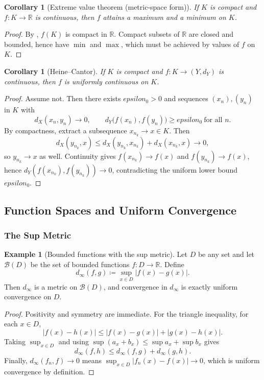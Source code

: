 \documentclass[12pt]{article}
\numberwithin{equation}{section}
\def\abs#1{|#1|}
\def\eps{epsilon}
\newcommand{\RR}{\mathbb{R}}
\DeclarePairedDelimiter{\abs}{\lvert}{\rvert}
\newcommand{\eps}{\varepsilon}               %
\theoremstyle{plain}
\newtheorem{corollary}[theorem]{Corollary}
\theoremstyle{definition}
\newtheorem{example}[theorem]{Example}
\theoremstyle{remark}
\begin{document}
\begin{corollary}[Extreme value theorem (metric-space form)]\label{ms:cor:evt}
If $K$ is compact and $f:K\to\RR$ is continuous, then $f$ attains a maximum and a minimum on $K$.
\end{corollary}

\begin{proof}
By , $f(K)$ is compact in $\RR$.
Compact subsets of $\RR$ are closed and bounded, hence have $\min$ and $\max$, which must be achieved by values of $f$ on $K$.
\end{proof}

\begin{corollary}[Heine--Cantor]\label{ms:cor:heine-cantor}
If $K$ is compact and $f:K\to(Y,d_Y)$ is continuous, then $f$ is uniformly continuous on $K$.
\end{corollary}

\begin{proof}
Assume not. Then there exists $\eps_0>0$ and sequences $(x_n),(y_n)$ in $K$ with
\[
d_X(x_n,y_n)\to 0,
\qquad
d_Y\bigl(f(x_n),f(y_n)\bigr)\ge \eps_0\ \text{for all }n.
\]
By compactness, extract a subsequence $x_{n_k}\to x\in K$.
Then
\[
d_X(y_{n_k},x)\le d_X(y_{n_k},x_{n_k})+d_X(x_{n_k},x)\to 0,
\]
so $y_{n_k}\to x$ as well.
Continuity gives $f(x_{n_k})\to f(x)$ and $f(y_{n_k})\to f(x)$, hence
$d_Y(f(x_{n_k}),f(y_{n_k}))\to 0$, contradicting the uniform lower bound $\eps_0$.
\end{proof}

\subsection{Function Spaces and Uniform Convergence}

\subsubsection{The Sup Metric}

\begin{example}[Bounded functions with the sup metric]\label{ms:ex:sup-metric}
Let $D$ be any set and let $\mathcal{B}(D)$ be the set of bounded functions $f:D\to\RR$.
Define
\[
d_\infty(f,g)\coloneqq \sup_{x\in D}\abs{f(x)-g(x)}.
\]
Then $d_\infty$ is a metric on $\mathcal{B}(D)$, and convergence in $d_\infty$ is exactly uniform convergence on $D$.
\end{example}

\begin{proof}
Positivity and symmetry are immediate.
For the triangle inequality, for each $x\in D$,
\[
\abs{f(x)-h(x)}\le \abs{f(x)-g(x)}+\abs{g(x)-h(x)}.
\]
Taking $\sup_{x\in D}$ and using $\sup(a_x+b_x)\le \sup a_x+\sup b_x$ gives
\[
d_\infty(f,h)\le d_\infty(f,g)+d_\infty(g,h).
\]
Finally, $d_\infty(f_n,f)\to 0$ means $\sup_{x\in D}|f_n(x)-f(x)|\to 0$, which is uniform convergence by definition.
\end{proof}
\end{document}
